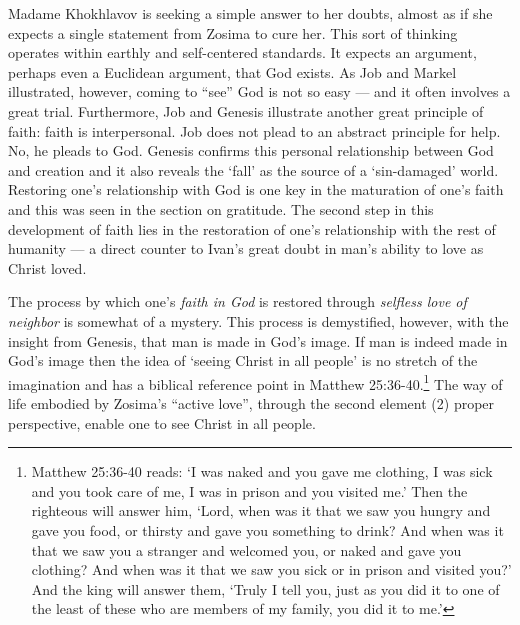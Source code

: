 Madame Khokhlavov is seeking a simple answer to her doubts, almost as if she expects a single statement from Zosima to cure her. This sort of thinking operates within earthly and self-centered standards. It expects an argument, perhaps even a Euclidean argument, that God exists. As Job and Markel illustrated, however, coming to ``see'' God is not so easy --- and it often involves a great trial. Furthermore, Job and Genesis illustrate another great principle of faith: faith is interpersonal. Job does not plead to an abstract principle for help. No, he pleads to God. Genesis confirms this personal relationship between God and creation and it also reveals the `fall' as the source of a `sin-damaged' world. Restoring one's relationship with God is one key in the maturation of one's faith and this was seen in the section on gratitude. The second step in this development of faith lies in the restoration of one's relationship with the rest of humanity --- a direct counter to Ivan's great doubt in man's ability to love as Christ loved. 

The process by which one's \emph{faith in God} is restored through \emph{selfless love of neighbor} is somewhat of a mystery. This process is demystified, however, with the insight from Genesis, that man is made in God's image. If man is indeed made in God's image then the idea of `seeing Christ in all people' is no stretch of the imagination and has a biblical reference point in Matthew 25:36-40.\footnote{Matthew 25:36-40 reads: `I was naked and you gave me clothing, I was sick and you took care of me, I was in prison and you visited me.' Then the righteous will answer him, `Lord, when was it that we saw you hungry and gave you food, or thirsty and gave you something to drink? And when was it that we saw you a stranger and welcomed you, or naked and gave you clothing? And when was it that we saw you sick or in prison and visited you?' And the king will answer them, `Truly I tell you, just as you did it to one of the least of these who are members of my family, you did it to me.'} The way of life embodied by Zosima's ``active love'', through the second element (2) proper perspective, enable one to see Christ in all people.

